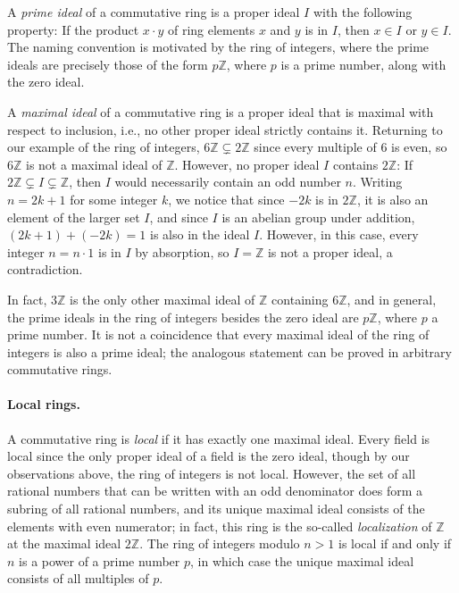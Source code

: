 \documentclass{article}
\begin{document}
A \emph{prime ideal} of a commutative ring is a proper ideal $I$ with the following property:  
If the product $x \cdot y$ of ring elements $x$ and $y$ is in $I$, then $x \in I$ or $y \in I$.
The naming convention is motivated by the ring of integers, where the prime ideals are precisely those 
of the form $p\mathbb{Z}$, where $p$ is a prime number, along with the zero ideal. 

A \emph{maximal ideal} of a commutative ring is a proper ideal that is maximal
with respect to inclusion, i.e., no other proper ideal strictly contains it. 
Returning to our example of the ring of integers,
$6 \mathbb{Z} \subsetneq 2 \mathbb{Z}$ since every multiple of $6$ is even, so
$6 \mathbb{Z}$ is not a maximal ideal of $\mathbb{Z}$. However, no proper ideal
$I$ contains $2 \mathbb{Z}$: If $2\mathbb{Z}\subsetneq I\subsetneq \mathbb{Z}$,
then $I$  would necessarily contain an odd number $n$. Writing $n=2k+1$ for
some integer $k$, we notice that since $-2k$ is in $2\mathbb{Z}$, it is also an
element of the larger set $I$, and since $I$ is an abelian group under
addition, $(2k+1) + (-2k) = 1$ is also in the ideal $I$. However, in this case,
every integer $n = n \cdot 1$ is in $I$ by absorption, so $I = \mathbb{Z}$ is
not a proper ideal, a contradiction. 

In fact, $3 \mathbb{Z}$ is the only other maximal ideal of $\mathbb{Z}$
containing $6 \mathbb{Z}$, and in general, the prime ideals in the ring of
integers besides the zero ideal are  $p \mathbb{Z}$, where $p$
a prime number. 
It is not a coincidence that every maximal ideal of the ring of integers is also a prime 
ideal; the analogous statement can be proved in arbitrary commutative rings. 


\paragraph{Local rings.}
A commutative ring is \emph{local} if it has exactly one maximal ideal. 
Every field is local since the only proper ideal of a field is the zero ideal,
though by our observations above, the ring of integers is not local. 
However, the set of all rational numbers that can be written with an odd
denominator does form a subring of all rational numbers, and its unique maximal
ideal consists of the elements with even numerator; in fact, this ring is the
so-called \emph{localization} of $\mathbb{Z}$ at the maximal ideal
$2\mathbb{Z}$. The ring of integers modulo $n>1$ is local if and only if $n$ is
a power of a prime number $p$, in which case the unique maximal ideal consists
of all multiples of $p$. 
\end{document}
